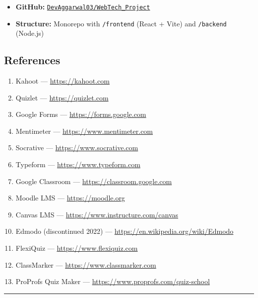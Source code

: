 \documentclass[12pt,a4paper]{article}
\begin{document}
\begin{itemize}[leftmargin=1.5em]
  \item \textbf{GitHub:} \href{https://github.com/DevAggarwal03/WebTech_Project}{\texttt{DevAggarwal03/WebTech\_Project}}
  \item \textbf{Structure:} Monorepo with \texttt{/frontend} (React + Vite) and \texttt{/backend} (Node.js)
\end{itemize}

\subsection{References}

\begin{enumerate}[leftmargin=1.5em]
  \item Kahoot --- \url{https://kahoot.com}
  \item Quizlet --- \url{https://quizlet.com}
  \item Google Forms --- \url{https://forms.google.com}
  \item Mentimeter --- \url{https://www.mentimeter.com}
  \item Socrative --- \url{https://www.socrative.com}
  \item Typeform --- \url{https://www.typeform.com}
  \item Google Classroom --- \url{https://classroom.google.com}
  \item Moodle LMS --- \url{https://moodle.org}
  \item Canvas LMS --- \url{https://www.instructure.com/canvas}
  \item Edmodo (discontinued 2022) --- \url{https://en.wikipedia.org/wiki/Edmodo}
  \item FlexiQuiz --- \url{https://www.flexiquiz.com}
  \item ClassMarker --- \url{https://www.classmarker.com}
  \item ProProfs Quiz Maker --- \url{https://www.proprofs.com/quiz-school}
\end{enumerate}

\vspace{1.5cm}
\noindent\rule{\linewidth}{0.4pt}\\[0.3em]

\end{document}
